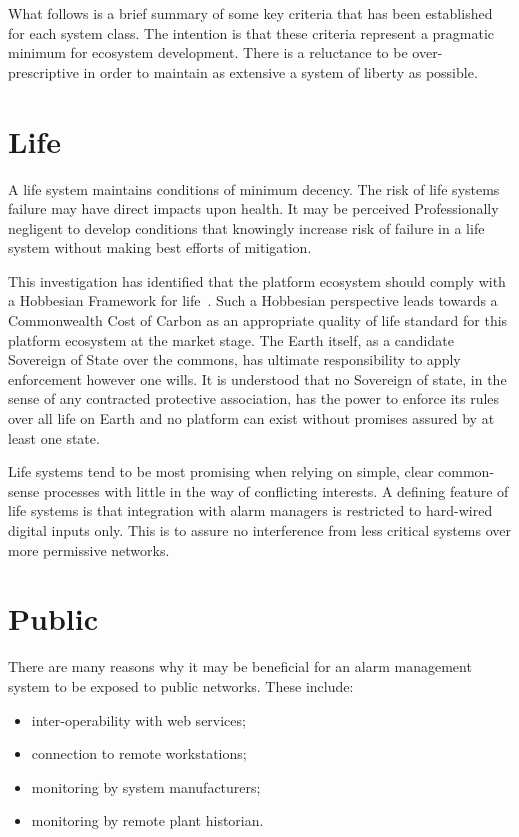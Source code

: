 \documentclass[11pt, oneside]{book}   	%
\begin{document}
\pagebreak

What follows is a brief summary of some key criteria that has been established for each system class.
The intention is that these criteria represent a pragmatic minimum for ecosystem development.
There is a reluctance to be over-prescriptive in order to maintain as extensive a system of liberty as possible.

\section{Life}
A life system maintains conditions of minimum decency.
The risk of life systems failure may have direct impacts upon health.
It may be perceived Professionally negligent to develop conditions that knowingly increase risk of failure in a life system without making best efforts of mitigation.\

This investigation has identified that the platform ecosystem should comply with a Hobbesian Framework for life~\cite{th1}.
Such a Hobbesian perspective leads towards a Commonwealth Cost of Carbon as an appropriate quality of life standard for this platform ecosystem at the market stage.
The Earth itself, as a candidate Sovereign of State over the commons, has ultimate responsibility to apply enforcement however one wills.
It is understood that no Sovereign of state, in the sense of any contracted protective association, has the power to enforce its rules over all life on Earth and no platform can exist without promises assured by at least one state.\

Life systems tend to be most promising when relying on simple, clear common-sense processes with little in the way of conflicting interests.
A defining feature of life systems is that integration with alarm managers is restricted to hard-wired digital inputs only.
This is to assure no interference from less critical systems over more permissive networks.\

\section{Public}

There are many reasons why it may be beneficial for an alarm management system to be exposed to public networks.
These include:
\begin{itemize}
	\item inter-operability with web services; 
	\item connection to remote workstations;
	\item monitoring by system manufacturers;
	\item monitoring by remote plant historian.
\end{itemize}\
\end{document}
